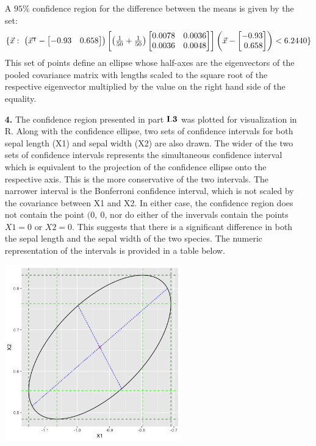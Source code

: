 \begin{enumerate}
	A $95\%$ confidence region for the difference between the means is given by the set: $$\{\vec{x}:\ \p{\vec{x}^{\intercal} - \m{-0.93 & 0.658}} \m{\p{\frac{1}{50} + \frac{1}{50}} \m{0.0078&0.0036\\0.0036&0.0048}} \p{\vec{x} -  \m{-0.93 \\ 0.658}} < 6.2440\}$$ This set of points define an ellipse whose half-axes are the eigenvectors of the pooled covariance matrix with lengths scaled to the square root of the respective eigenvector multiplied by the value on the right hand side of the equality.

\item[\bf{4.}]	
	The confidence region presented in part $\mathrm{\bf{I.3}}$ was plotted for visualization in R. Along with the confidence ellipse, two sets of confidence intervals for both sepal length (X1) and sepal width (X2) are also drawn. The wider of the two sets of confidence intervals represents the simultaneous confidence interval which is equivalent to the projection of the confidence ellipse onto the respective axis. This is the more conservative of the two intervals. The narrower interval is the Bonferroni confidence interval, which is not scaled by the covariance between X1 and X2. In either case, the confidence region does not contain the point $(0,\ 0$, nor do either of the invervals contain the points $X1 = 0$ or $X2 = 0$. This suggests that there is a significant difference in both the sepal length and the sepal width of the two species. The numeric representation of the intervals is provided in a table below.

\begin{center}
	\includegraphics[width=3.0in]{I_4_ellipse.png}
\end{center}


\end{enumerate}
